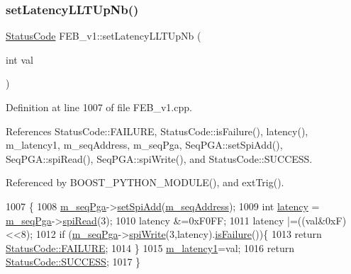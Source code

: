 \subsubsection{\texorpdfstring{set\+Latency\+L\+L\+T\+Up\+Nb()}{setLatencyLLTUpNb()}}
{\footnotesize\ttfamily \hyperlink{classStatusCode}{Status\+Code} F\+E\+B\+\_\+v1\+::set\+Latency\+L\+L\+T\+Up\+Nb (\begin{DoxyParamCaption}\item[{int}]{val }\end{DoxyParamCaption})}



Definition at line 1007 of file F\+E\+B\+\_\+v1.\+cpp.



References Status\+Code\+::\+F\+A\+I\+L\+U\+RE, Status\+Code\+::is\+Failure(), latency(), m\+\_\+latency1, m\+\_\+seq\+Address, m\+\_\+seq\+Pga, Seq\+P\+G\+A\+::set\+Spi\+Add(), Seq\+P\+G\+A\+::spi\+Read(), Seq\+P\+G\+A\+::spi\+Write(), and Status\+Code\+::\+S\+U\+C\+C\+E\+SS.



Referenced by B\+O\+O\+S\+T\+\_\+\+P\+Y\+T\+H\+O\+N\+\_\+\+M\+O\+D\+U\+L\+E(), and ext\+Trig().


\begin{DoxyCode}
1007                                            \{
1008   \hyperlink{classFEB__v1_a6c7804ac86796f233a8393043adf2e77}{m\_seqPga}->\hyperlink{classSeqPGA_ac998ce3a6d9b5f2e88cc8393f8c1df53}{setSpiAdd}(\hyperlink{classFEB__v1_a1c1eb093fd1733b9510fcf8bc5c7ad08}{m\_seqAddress});
1009   \textcolor{keywordtype}{int} \hyperlink{classFEB__v1_a68050d232efd8d6568910b09a2c18f62}{latency} = \hyperlink{classFEB__v1_a6c7804ac86796f233a8393043adf2e77}{m\_seqPga}->\hyperlink{classSeqPGA_ab3d0e5e5d4014bc7a92588a76b8713d4}{spiRead}(3);
1010   latency &=0xF0FF;
1011   latency |=((val&0xF)<<8);
1012    \textcolor{keywordflow}{if} (\hyperlink{classFEB__v1_a6c7804ac86796f233a8393043adf2e77}{m\_seqPga}->\hyperlink{classSeqPGA_ad4421841ce4ce8b88ad13f63216f0743}{spiWrite}(3,latency).\hyperlink{classStatusCode_a5dd22dc6eb2c52fc4cabc58f6dea2eb7}{isFailure}())\{
1013     \textcolor{keywordflow}{return} \hyperlink{classStatusCode_a6f565cbeadc76d14c72f047e5e85eb4ba3da73d4c469762eb9d3c960368252b26}{StatusCode::FAILURE};
1014   \}
1015    \hyperlink{classFEB__v1_a026d2f4973bf3ddbc404e35264fdef1f}{m\_latency1}=val;
1016   \textcolor{keywordflow}{return} \hyperlink{classStatusCode_a6f565cbeadc76d14c72f047e5e85eb4badd0da38d3ba0d922efd1f4619bc37ad8}{StatusCode::SUCCESS};   
1017 \}
\end{DoxyCode}
\mbox{\label{classFEB__v1_a5a177c98b2be429aacbb3d652f40b247}} 
